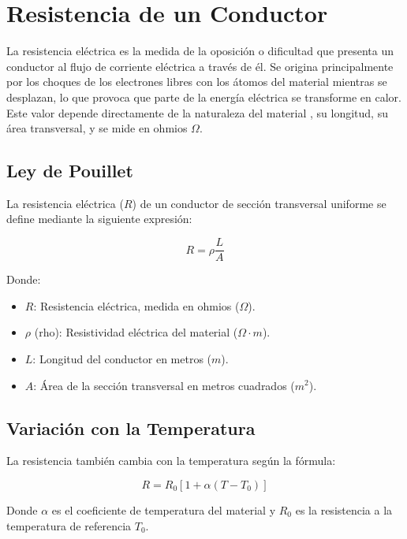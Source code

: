 \documentclass[../main]{subfiles}
\begin{document}
\chapter{Resistencia de un Conductor}

La resistencia eléctrica es la medida de la oposición o dificultad que
presenta un conductor al flujo de corriente eléctrica a través de él.
Se origina principalmente por los choques de los electrones libres con los
átomos del material mientras se desplazan, lo que provoca que parte de
la energía eléctrica se transforme en calor. \cite[cap.~2]{Paraninfo}
Este valor depende directamente de la naturaleza del material
, su longitud, su área transversal, y se mide en ohmios $\Omega$.

\section{Ley de Pouillet}

La resistencia eléctrica ($R$) de un conductor de sección transversal
uniforme se define mediante la siguiente expresión:

\begin{equation}
  R = \rho \frac{L}{A}
\end{equation}

Donde:
\begin{itemize}
  \item \textbf{$R$}: Resistencia eléctrica, medida en ohmios ($\Omega$).
  \item \textbf{$\rho$} (rho): Resistividad eléctrica del material
    ($\Omega \cdot m$).
  \item \textbf{$L$}: Longitud del conductor en metros ($m$).
  \item \textbf{$A$}: Área de la sección transversal en metros
    cuadrados ($m^2$).
\end{itemize}

\section{Variación con la Temperatura}
La resistencia también cambia con la temperatura según la fórmula:

\begin{equation}
  R = R_0 [1 + \alpha(T - T_0)]
\end{equation}

Donde $\alpha$ es el coeficiente de temperatura del material y $R_0$
es la resistencia a la temperatura de referencia $T_0$.
\end{document}
